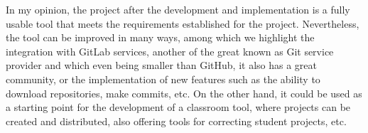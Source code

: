 In my opinion, the project after the development and implementation is
a fully usable tool that meets the requirements established for the
project. Nevertheless, the tool can be improved in many ways, among
which we highlight the integration with GitLab services, another of
the great known as Git service provider and which even being smaller
than GitHub, it also has a great community, or the implementation of
new features such as the ability to download repositories, make
commits, etc. On the other hand, it could be used as a starting point
for the development of a classroom tool, where projects can be created
and distributed, also offering tools for correcting student projects,
etc.















